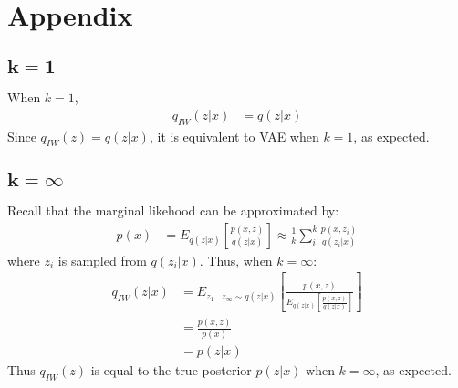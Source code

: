\documentclass{article} %
\begin{document}




\section{Appendix}


\subsection{\texorpdfstring{$\boldsymbol{k=1}$}{k=1}}

When $k=1$, %
\begin{align} 
    q_{IW}(z|x) 
    &= q(z|x)
\end{align}
Since $q_{IW}(z)=q(z|x)$, it is equivalent to VAE when $k=1$, as expected.











\subsection{\texorpdfstring{$\boldsymbol{k=\infty}$}{k=inf}} %

Recall that the marginal likehood can be approximated by:
\begin{align} 
    p(x) &= E_{q(z|x)}\left[\frac{p(x,z)}{q(z|x)} \right] \approx \frac{1}{k}\sum_i^k \frac{p(x,z_i)}{q(z_i|x)}
\end{align}
where $z_i$ is sampled from $q(z_i|x)$. Thus, when $k=\infty$:
\begin{align} 
    q_{IW}(z|x) &= E_{z_{1}...z_{\infty} \sim q(z|x)} \left[\frac{p(x,z)}{E_{q(z|x)}\left[\frac{p(x,z)}{q(z|x)} \right]}  \right] \\
    &= \frac{p(x,z)}{p(x)} \\
    &= p(z|x)
\end{align}
Thus $q_{IW}(z)$ is equal to the true posterior $p(z|x)$ when $k=\infty$, as expected.
\end{document}
